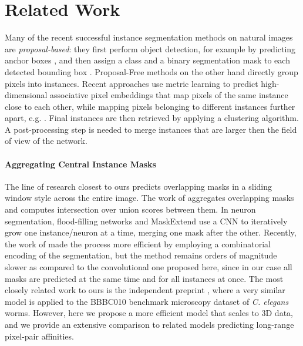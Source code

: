 
\section{Related Work} \label{sec:related_work_LSI}
Many of the recent successful instance segmentation methods on natural images are \emph{proposal-based}: they first perform object detection, for example by predicting anchor boxes \cite{ren2015faster}, and then assign a class and a binary segmentation mask to each detected bounding box \cite{he2017mask,porzi2019seamless}.
Proposal-Free methods on the other hand directly group pixels into instances. 
Recent approaches use metric learning to predict high-dimensional associative pixel embeddings that map pixels of the same instance close to each other, while mapping pixels belonging to different instances further apart, e.g. \cite{lee2019learning,kong2018recurrentPix}. %
Final instances are then retrieved by applying a clustering algorithm. A post-processing step is needed to merge instances that are larger then the field of view of the network. 

\paragraph{Aggregating Central Instance Masks}
The line of research closest to ours predicts overlapping \maskname masks in a sliding window style across the entire image. The work of \cite{liu2016multi} aggregates overlapping masks and computes intersection over union scores between them.
In neuron segmentation, flood-filling networks \cite{januszewski2018high} and MaskExtend \cite{meirovitch2016multi} use a CNN to iteratively grow one instance/neuron at a time, merging one mask after the other. Recently, the work of \cite{meirovitch2019cross} made the process more efficient by employing a combinatorial encoding of the segmentation, but the method remains orders of magnitude slower as compared to the convolutional one proposed here, since in our case all masks are predicted at the same time and for all instances at once.
The most closely related work to ours is the independent preprint \cite{hirsch2020patchperpix}, where a very similar model is applied to the BBBC010 benchmark microscopy dataset of \emph{C. elegans} worms. However, here we propose a more efficient model that scales to 3D data, and we provide an extensive comparison to related models predicting long-range pixel-pair affinities. 

